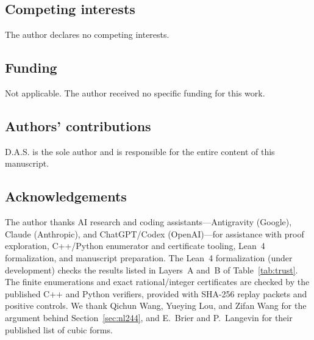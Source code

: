 \documentclass[11pt]{article}
\theoremstyle{definition}
\begin{document}
\subsection*{Competing interests}
The author declares no competing interests.

\subsection*{Funding}
Not applicable. The author received no specific funding for this work.

\subsection*{Authors' contributions}
D.A.S. is the sole author and is responsible for the entire content of this manuscript.

\subsection*{Acknowledgements}
The author thanks AI research and coding assistants---Antigravity (Google), Claude (Anthropic), and ChatGPT/Codex (OpenAI)---for assistance with proof exploration, C++/Python enumerator and certificate tooling, Lean~4 formalization, and manuscript preparation. The Lean~4 formalization (under development) checks the results listed in Layers~A and~B of Table~\ref{tab:trust}. The finite enumerations and exact rational/integer certificates are checked by the published C++ and Python verifiers, provided with SHA-256 replay packets and positive controls. We thank Qichun Wang, Yueying Lou, and Zifan Wang for the argument behind Section~\ref{sec:nl244}, and E.~Brier and P.~Langevin for their published list of cubic forms.
\end{document}
